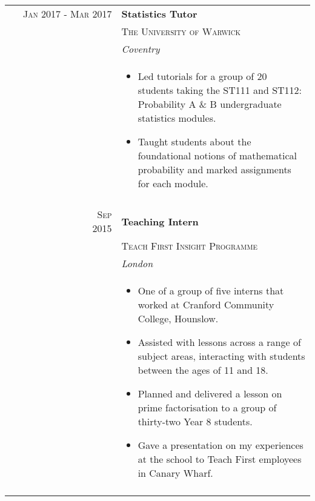 \documentclass[a4paper,10pt]{article}
\begin{document}
\begin{longtable}{rl}
\textsc{Jan} 2017 - \textsc{Mar} 2017
& \large{\textbf{Statistics Tutor}}\\
& \textsc{The University of Warwick}\\
& \textit{Coventry} \\
&\begin{minipage}[t]{0.8\textwidth}
 \begin{itemize}[leftmargin=*]
 \item Led tutorials for a group of 20 students taking the ST111 and ST112: Probability A \& B undergraduate statistics modules.
 \item Taught students about the foundational notions of mathematical probability and marked assignments for each module.
\end{itemize}
\end{minipage}\\&\\

\ \ \ \ \ \ \ \ \ \ \ \ \ \ \ \ \ \textsc{Sep} 2015
& \large{\textbf{Teaching Intern}}\\
& \textsc{Teach First Insight Programme}\\
& \textit{London} \\
&\begin{minipage}[t]{0.8\textwidth}
 \begin{itemize}[leftmargin=*]
 \item One of a group of five interns that worked at Cranford Community College, Hounslow.
 \item Assisted with lessons across a range of subject areas, interacting with students between the ages of 11 and 18.   
 \item Planned and delivered a lesson on prime factorisation to a group of thirty-two Year 8 students.
 \item Gave a presentation on my experiences at the school to Teach First employees in Canary Wharf. \end{itemize}
\end{minipage}\\&\\

\end{longtable}

\end{document}
